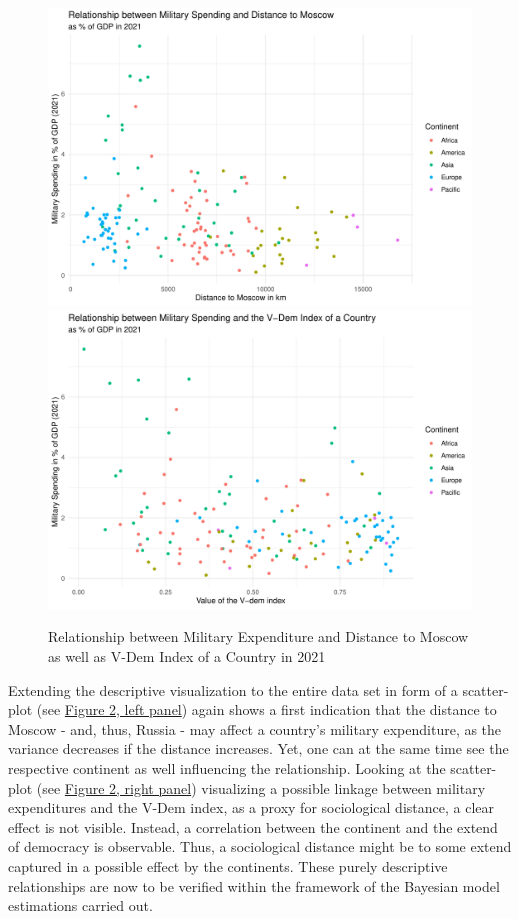\documentclass[12pt,a4paper]{article}
\begin{document}
\clearpage
\begin{figure}
\center
\label{F:2}
\includegraphics[scale=0.36]{Plot2.pdf}
\includegraphics[scale=0.36]{Plot3.pdf}
\caption{Relationship between Military Expenditure and Distance to Moscow as well as V-Dem Index of a Country in 2021}
\end{figure}

Extending the descriptive visualization to the entire data set in form of a scatter-plot (see \hyperref[F:2]{\color{blue}Figure 2, left panel}) again shows a first indication that the distance to Moscow - and, thus, Russia - may affect a country's military expenditure, as the variance decreases if the distance increases. Yet, one can at the same time see the respective continent as well influencing the relationship. Looking at the scatter-plot (see \hyperref[F:2]{\color{blue}Figure 2, right panel}) visualizing a possible linkage between military expenditures and the V-Dem index, as a proxy for sociological distance, a clear effect is not visible.  Instead, a correlation between the continent and the extend of democracy is observable. Thus, a sociological distance might be to some extend captured in a possible effect by the continents. These purely descriptive relationships are now to be verified within the framework of the Bayesian model estimations carried out.  
\end{document}
